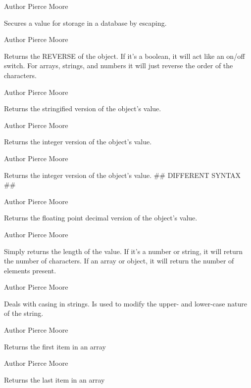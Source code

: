 \begin{DoxyAuthor}{Author}
Pierce Moore
\end{DoxyAuthor}
Secures a value for storage in a database by escaping.

\begin{DoxyAuthor}{Author}
Pierce Moore
\end{DoxyAuthor}
Returns the R\-E\-V\-E\-R\-S\-E of the object. If it's a boolean, it will act like an on/off switch. For arrays, strings, and numbers it will just reverse the order of the characters.

\begin{DoxyAuthor}{Author}
Pierce Moore
\end{DoxyAuthor}
Returns the stringified version of the object's value.

\begin{DoxyAuthor}{Author}
Pierce Moore
\end{DoxyAuthor}
Returns the integer version of the object's value.

\begin{DoxyAuthor}{Author}
Pierce Moore
\end{DoxyAuthor}
Returns the integer version of the object's value. \#\# D\-I\-F\-F\-E\-R\-E\-N\-T S\-Y\-N\-T\-A\-X \#\#

\begin{DoxyAuthor}{Author}
Pierce Moore
\end{DoxyAuthor}
Returns the floating point decimal version of the object's value.

\begin{DoxyAuthor}{Author}
Pierce Moore
\end{DoxyAuthor}
Simply returns the length of the value. If it's a number or string, it will return the number of characters. If an array or object, it will return the number of elements present.

\begin{DoxyAuthor}{Author}
Pierce Moore
\end{DoxyAuthor}
Deals with casing in strings. Is used to modify the upper-\/ and lower-\/case nature of the string.

\begin{DoxyAuthor}{Author}
Pierce Moore
\end{DoxyAuthor}
Returns the first item in an array

\begin{DoxyAuthor}{Author}
Pierce Moore
\end{DoxyAuthor}
Returns the last item in an array

